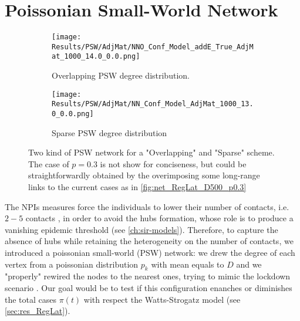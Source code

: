 \documentclass[a4paper,10pt,twoside]{book} %
\theoremstyle{definition}
\begin{document}
\section{Poissonian Small-World Network}
\label{sec:res_PSW}
\begin{figure}[ht]
    \begin{subfigure}{.45\linewidth}
        \texttt{[image: Results/PSW/AdjMat/NNO\_Conf\_Model\_addE\_True\_AdjMat\_1000\_14.0\_0.0.png]}
        \centering
        \caption{Overlapping PSW degree distribution. }
        \label{fig:net_O-PSW}
    \end{subfigure}
	\hfill
	\begin{subfigure}{.45\linewidth}
        \texttt{[image: Results/PSW/AdjMat/NN\_Conf\_Model\_AdjMat\_1000\_13.0\_0.0.png]}
        \centering
        \caption{Sparse PSW degree distribution}
        \label{fig:net_S-PSW}
    \end{subfigure}
	\caption{Two kind of PSW network for a "Overlapping" and "Sparse" scheme. The case of $p = 0.3$ is not show for conciseness, but could be straightforwardly obtained by the overimposing some long-range links to the current cases as in \autoref{fig:net_RegLat_D500_p0.3}}
\end{figure}
The NPIs measures force the individuals to lower their number of contacts, i.e. $2-5$ contacts \cite{Liu::2021_Review_SContactPattern}, in order to avoid the hubs formation, whose role is to produce a vanishing epidemic threshold (see \autoref{ch:sir-models}).
Therefore, to capture the absence of hubs while retaining the heterogeneity on the number of contacts, we introduced a poissonian small-world (PSW) network: we drew the degree of each vertex from a poissonian distribution $ p_k$ with mean equals to $ D$ and we "properly" rewired the nodes to the nearest ones, trying to mimic the lockdown scenario \cite{Thurner::Appendix_NetBasedExpl}.
Our goal would be to test if this configuration enanches or diminishes the total cases $ \pi(t)$ with respect the Watts-Strogatz model (see \autoref{sec:res_RegLat}).
\end{document}
